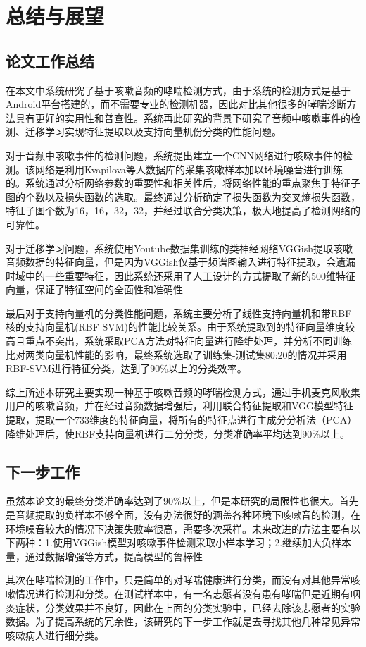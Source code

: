 \chapter{总结与展望}
\section{论文工作总结}
在本文中系统研究了基于咳嗽音频的哮喘检测方式，由于系统的检测方式是基于Android平台搭建的，而不需要专业的检测机器，因此对比其他很多的哮喘诊断方法具有更好的实用性和普查性。系统再此研究的背景下研究了音频中咳嗽事件的检测、迁移学习实现特征提取以及支持向量机份分类的性能问题。

对于音频中咳嗽事件的检测问题，系统提出建立一个CNN网络进行咳嗽事件的检测。该网络是利用Kvapilova等人数据库的采集咳嗽样本加以环境噪音进行训练的。系统通过分析网络参数的重要性和相关性后，将网络性能的重点聚焦于特征子图的个数以及损失函数的选取。最终通过分析确定了损失函数为交叉熵损失函数，特征子图个数为16，16，32，32，并经过联合分类决策，极大地提高了检测网络的可靠性。

对于迁移学习问题，系统使用Youtube数据集训练的类神经网络VGGish提取咳嗽音频数据的特征向量，但是因为VGGish仅基于频谱图输入进行特征提取，会遗漏时域中的一些重要特征，因此系统还采用了人工设计的方式提取了新的500维特征向量，保证了特征空间的全面性和准确性

最后对于支持向量机的分类性能问题，系统主要分析了线性支持向量机和带RBF核的支持向量机(RBF-SVM)的性能比较关系。由于系统提取到的特征向量维度较高且重点不突出，系统采取PCA方法对特征向量进行降维处理，并分析不同训练比对两类向量机性能的影响，最终系统选取了训练集-测试集80:20的情况并采用RBF-SVM进行特征分类，达到了90\%以上的分类效率。

综上所述本研究主要实现一种基于咳嗽音频的哮喘检测方式，通过手机麦克风收集用户的咳嗽音频，并在经过音频数据增强后，利用联合特征提取和VGG模型特征提取，提取一个733维度的特征向量，将所有的特征点进行主成分分析法（PCA）降维处理后，使RBF支持向量机进行二分分类，分类准确率平均达到90\%以上。

\section{下一步工作}
虽然本论文的最终分类准确率达到了90\%以上，但是本研究的局限性也很大。首先是音频提取的负样本不够全面，没有办法很好的涵盖各种环境下咳嗽音的检测，在环境噪音较大的情况下决策失败率很高，需要多次采样。未来改进的方法主要有以下两种：1.使用VGGish模型对咳嗽事件检测采取小样本学习；2.继续加大负样本量，通过数据增强等方式，提高模型的鲁棒性

其次在哮喘检测的工作中，只是简单的对哮喘健康进行分类，而没有对其他异常咳嗽情况进行检测和分类。在测试样本中，有一名志愿者没有患有哮喘但是近期有咽炎症状，分类效果并不良好，因此在上面的分类实验中，已经去除该志愿者的实验数据。为了提高系统的冗余性，该研究的下一步工作就是去寻找其他几种常见异常咳嗽病人进行细分类。
